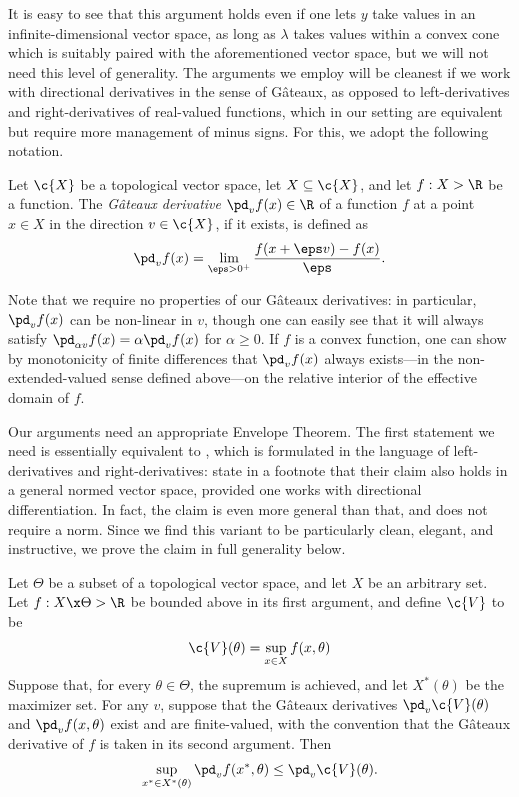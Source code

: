\documentclass{article}
\begin{document}
It is easy to see that this argument holds even if one lets $y$ take values in an infinite-dimensional vector space, as long as $\lambda$ takes values within a convex cone which is suitably paired with the aforementioned vector space, but we will not need this level of generality.
The arguments we employ will be cleanest if we work with directional derivatives in the sense of Gâteaux, as opposed to left-derivatives and right-derivatives of real-valued functions, which in our setting are equivalent but require more management of minus signs.
For this, we adopt the following notation.

\begin{definition}
\label{def:gateaux}
Let $\c{X}$ be a topological vector space, let $X \subseteq \c{X}$, and let $f : X \-> \R$ be a function.
The \emph{Gâteaux derivative} $\pd_v f(x) \in \R$ of a function $f$ at a point $x\in X$ in the direction $v \in \c{X}$, if it exists, is defined as
\[
\pd_v f(x) = \lim_{\eps\->0^+} \frac{f(x+\eps v) - f(x)}{\eps}
.
\]
\end{definition}

Note that we require no properties of our Gâteaux derivatives: in particular, $\pd_v f(x)$ can be non-linear in $v$, though one can easily see that it will always satisfy $\pd_{\alpha v} f(x) = \alpha \pd_v f(x)$ for $\alpha\geq0$.
If $f$ is a convex function, one can show by monotonicity of finite differences that $\pd_v f(x)$ always exists---in the non-extended-valued sense defined above---on the relative interior of the effective domain of $f$.

Our arguments need an appropriate Envelope Theorem.
The first statement we need is essentially equivalent to \textcite[Theorem 1]{milgrom2002envelope}, which is formulated in the language of left-derivatives and right-derivatives: \textcite{milgrom2002envelope} state in a footnote that their claim also holds in a general normed vector space, provided one works with directional differentiation.
In fact, the claim is even more general than that, and does not require a norm.
Since we find this variant to be particularly clean, elegant, and instructive, we prove the claim in full generality below.

\begin{lemma}
\label{lem:envelope}
Let $\Theta$ be a subset of a topological vector space, and let $X$ be an arbitrary set.
Let $f : X \x \Theta \-> \R$ be bounded above in its first argument, and define $\c{V}$ to be
\[
\c{V}(\theta) = \sup_{x\in X} f(x,\theta)
\]
Suppose that, for every $\theta\in\Theta$, the supremum is achieved, and let $X^*(\theta)$ be the maximizer set.
For any $v$, suppose that the Gâteaux derivatives $\pd_v \c{V}(\theta)$ and $\pd_v f(x,\theta)$ exist and are finite-valued, with the convention that the Gâteaux derivative of $f$ is taken in its second argument.
Then
\[
\sup_{x^*\in X^*(\theta)} \pd_v f(x^*, \theta) \leq \pd_v \c{V}(\theta)
.
\]
\end{lemma}
\end{document}
